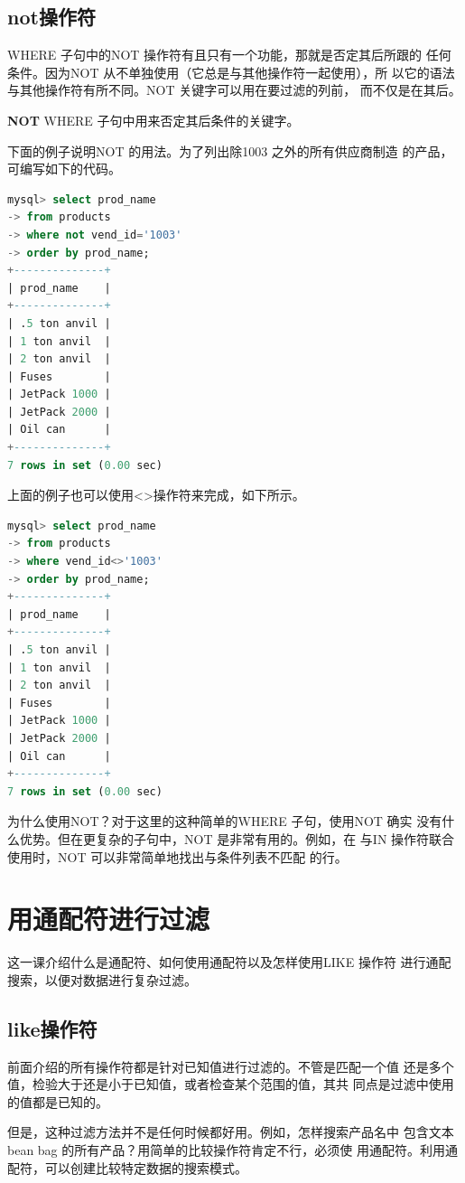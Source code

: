 \documentclass[11pt,a4paper,oneside]{book}
\begin{document}
\section{not操作符}
WHERE 子句中的NOT 操作符有且只有一个功能，那就是否定其后所跟的
任何条件。因为NOT 从不单独使用（它总是与其他操作符一起使用），所
以它的语法与其他操作符有所不同。NOT 关键字可以用在要过滤的列前，
而不仅是在其后。
\begin{tcolorbox}[colback=blue!7!white,colframe=blue!40]
	\textbf{NOT}
	WHERE 子句中用来否定其后条件的关键字。
\end{tcolorbox}
下面的例子说明NOT 的用法。为了列出除1003 之外的所有供应商制造
的产品，可编写如下的代码。
\begin{lstlisting}[language=sql]
mysql> select prod_name
-> from products
-> where not vend_id='1003'
-> order by prod_name;
+--------------+
| prod_name    |
+--------------+
| .5 ton anvil |
| 1 ton anvil  |
| 2 ton anvil  |
| Fuses        |
| JetPack 1000 |
| JetPack 2000 |
| Oil can      |
+--------------+
7 rows in set (0.00 sec)
\end{lstlisting}
上面的例子也可以使用<>操作符来完成，如下所示。
\begin{lstlisting}[language=sql]
mysql> select prod_name
-> from products
-> where vend_id<>'1003'
-> order by prod_name;
+--------------+
| prod_name    |
+--------------+
| .5 ton anvil |
| 1 ton anvil  |
| 2 ton anvil  |
| Fuses        |
| JetPack 1000 |
| JetPack 2000 |
| Oil can      |
+--------------+
7 rows in set (0.00 sec)
\end{lstlisting}

为什么使用NOT？对于这里的这种简单的WHERE 子句，使用NOT 确实
没有什么优势。但在更复杂的子句中，NOT 是非常有用的。例如，在
与IN 操作符联合使用时，NOT 可以非常简单地找出与条件列表不匹配
的行。

\chapter{用通配符进行过滤}
这一课介绍什么是通配符、如何使用通配符以及怎样使用LIKE 操作符
进行通配搜索，以便对数据进行复杂过滤。

\section{like操作符}
前面介绍的所有操作符都是针对已知值进行过滤的。不管是匹配一个值
还是多个值，检验大于还是小于已知值，或者检查某个范围的值，其共
同点是过滤中使用的值都是已知的。

但是，这种过滤方法并不是任何时候都好用。例如，怎样搜索产品名中
包含文本bean bag 的所有产品？用简单的比较操作符肯定不行，必须使
用通配符。利用通配符，可以创建比较特定数据的搜索模式。
\end{document}
